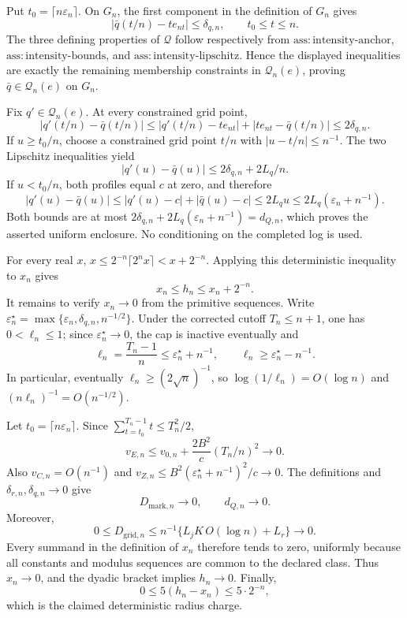 Put \(t_0=\lceil n\varepsilon_n\rceil\).  On \(G_n\), the first component in the definition of \(G_n\) gives
\[
 \left|\bar q(t/n)-t e_{nt}\right|\leq\delta_{q,n},
 \qquad t_0\leq t\leq n.
\]
The three defining properties of \(\mathcal Q\) follow respectively from
\(\mathrm{ass:intensity\mbox{-}anchor}\),
\(\mathrm{ass:intensity\mbox{-}bounds}\), and
\(\mathrm{ass:intensity\mbox{-}lipschitz}\).  Hence the displayed inequalities are exactly the remaining membership constraints in \(\mathcal Q_n(e)\), proving
\(\bar q\in\mathcal Q_n(e)\) on \(G_n\).

Fix \(q'\in\mathcal Q_n(e)\).  At every constrained grid point,
\[
 |q'(t/n)-\bar q(t/n)|
 \leq |q'(t/n)-t e_{nt}|+|t e_{nt}-\bar q(t/n)|
 \leq 2\delta_{q,n}.
\]
If \(u\geq t_0/n\), choose a constrained grid point \(t/n\) with
\(|u-t/n|\leq n^{-1}\).  The two Lipschitz inequalities yield
\[
 |q'(u)-\bar q(u)|
 \leq 2\delta_{q,n}+2L_q/n.
\]
If \(u<t_0/n\), both profiles equal \(c\) at zero, and therefore
\[
 |q'(u)-\bar q(u)|
 \leq |q'(u)-c|+|\bar q(u)-c|
 \leq 2L_q u
 \leq 2L_q(\varepsilon_n+n^{-1}).
\]
Both bounds are at most
\(2\delta_{q,n}+2L_q(\varepsilon_n+n^{-1})=d_{Q,n}\), which proves the asserted uniform enclosure.  No conditioning on the completed log is used.

For every real \(x\), \(x\leq 2^{-n}\lceil2^n x\rceil<x+2^{-n}\).  Applying this deterministic inequality to \(x_n\) gives
\[
 x_n\leq h_n\leq x_n+2^{-n}.
\]
It remains to verify \(x_n\to0\) from the primitive sequences.  Write
\(\varepsilon_n^\star=\max\{\varepsilon_n,\delta_{q,n},n^{-1/2}\}\).
Under the corrected cutoff \(T_n\leq n+1\), one has \(0<\ell_n\leq1\);
since \(\varepsilon_n^\star\to0\), the cap is inactive eventually and
\[
 \ell_n=\frac{T_n-1}{n}\leq
 \varepsilon_n^\star+n^{-1},\qquad
 \ell_n\geq \varepsilon_n^\star-n^{-1}.
\]
In particular, eventually \(\ell_n\geq (2\sqrt n)^{-1}\), so
\(\log(1/\ell_n)=O(\log n)\) and
\((n\ell_n)^{-1}=O(n^{-1/2})\).

Let \(t_0=\lceil n\varepsilon_n\rceil\).  Since
\(\sum_{t=t_0}^{T_n-1}t\leq T_n^2/2\),
\[
 v_{E,n}\leq v_{0,n}+\frac{2B^2}{c}(T_n/n)^2\longrightarrow0.
\]
Also \(v_{C,n}=O(n^{-1})\) and
\(v_{Z,n}\leq B^2(\varepsilon_n^\star+n^{-1})^2/c\to0\).
The definitions and \(\delta_{r,n},\delta_{q,n}\to0\) give
\[
 D_{\mathrm{mark},n}\to0,\qquad d_{Q,n}\to0.
\]
Moreover,
\[
 0\leq D_{\mathrm{grid},n}
 \leq n^{-1}\{L_jK\,O(\log n)+L_r\}\longrightarrow0.
\]
Every summand in the definition of \(x_n\) therefore tends to zero, uniformly because all constants and modulus sequences are common to the declared class.  Thus \(x_n\to0\), and the dyadic bracket implies \(h_n\to0\).  Finally,
\[
 0\leq5(h_n-x_n)\leq5\cdot2^{-n},
\]
which is the claimed deterministic radius charge.

